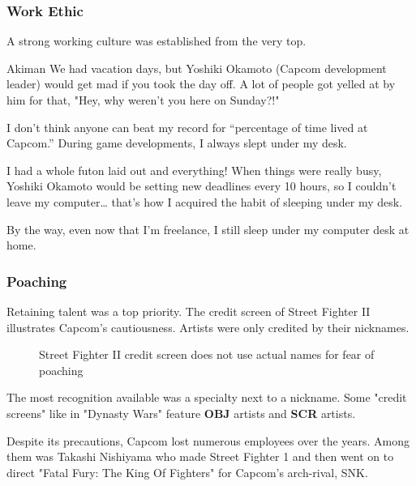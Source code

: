 \subsubsection{Work Ethic}

A strong working culture was established from the very top.

\begin{q}{Akiman\cite{akiman2003}}
  We had vacation days, but Yoshiki Okamoto (Capcom development leader) would get mad if you took the day off. A lot of people got yelled at by him for that, "Hey, why weren't you here on Sunday?!"

  I don't think anyone can beat my record for “percentage of time lived at Capcom.” During game developments, I always slept under my desk. 

  I had a whole futon laid out and everything! When things were really busy, Yoshiki Okamoto  would be setting new deadlines every 10 hours, so I couldn't leave my computer… that's how I acquired the habit of sleeping under my desk. 

  By the way, even now that I'm freelance, I still sleep under my computer desk at home.
  \end{q}

\subsubsection{Poaching}


Retaining talent was a top priority. The credit screen of Street Fighter II illustrates Capcom's cautiousness. Artists were only credited by their nicknames.

 \begin{figure}[H]
\caption*{Street Fighter II credit screen does not use actual names for fear of poaching}
\end{figure}

\begin{trivia}
The most recognition available was a specialty next to a nickname. Some "credit screens" like in "Dynasty Wars" feature \textbf{OBJ} artists and \textbf{SCR} artists.
\end{trivia}


Despite its precautions, Capcom lost numerous employees over the years. Among them was Takashi Nishiyama who made Street Fighter 1 and then went on to direct "Fatal Fury: The King Of Fighters" for Capcom's arch-rival, SNK\cite{YoshikiOkamotoTakashiNishiyama}.
 










